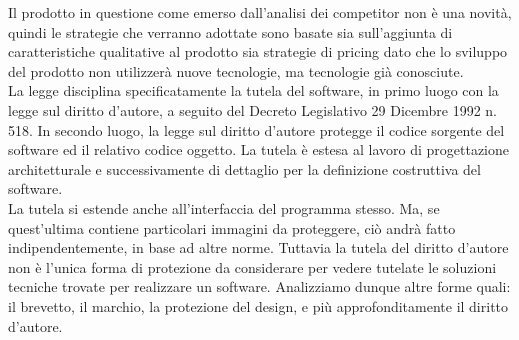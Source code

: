 Il prodotto in questione come emerso dall\textquoteright{}analisi dei competitor non è una novità, quindi le strategie che verranno adottate sono basate sia sull'aggiunta di caratteristiche qualitative al prodotto sia strategie di pricing dato che lo sviluppo del prodotto non utilizzerà nuove tecnologie, ma tecnologie già conosciute. \\
La legge disciplina specificatamente la tutela del software, in primo luogo con la legge sul diritto d'autore, a seguito del Decreto Legislativo 29 Dicembre 1992 n. 518. In secondo luogo, la legge sul diritto d'autore protegge il codice sorgente del software ed il relativo codice oggetto. La tutela è estesa al lavoro di progettazione architetturale e successivamente di dettaglio per la definizione costruttiva del software.\\
La tutela si estende anche all'interfaccia del programma stesso. Ma, se quest'ultima contiene particolari immagini da proteggere, ciò andrà fatto indipendentemente, in base ad altre norme. Tuttavia la tutela del diritto d'autore non è l'unica forma di protezione da considerare per vedere tutelate le soluzioni tecniche trovate per realizzare un software. Analizziamo dunque altre forme quali: il brevetto, il marchio, la protezione del design, e più approfonditamente il diritto d'autore.

